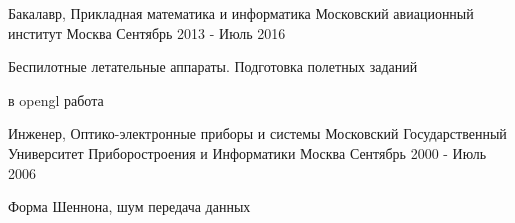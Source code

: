 

\begin{cventries}

  \cventry
    {Бакалавр, Прикладная математика и информатика} %
    {Московский авиационный институт} %
    {Москва} %
    {Сентябрь 2013 - Июль 2016} %
    {
      \begin{cvitems} %
        \item {Беспилотные летательные аппараты. Подготовка полетных заданий}
        \item {в opengl работа}
      \end{cvitems}
    }
  \cventry
    {Инженер, Оптико-электронные приборы и системы} %
    {Московский Государственный Университет Приборостроения и Информатики} %
    {Москва} %
    {Сентябрь 2000 - Июль 2006} %
    {
      \begin{cvitems} %
        \item {Форма Шеннона, шум передача данных}
      \end{cvitems}
    }

\end{cventries}
